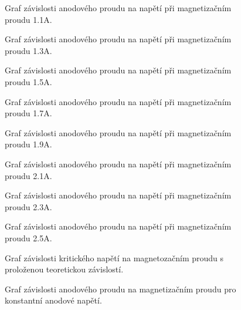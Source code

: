 \documentclass[a4paper,12pt]{article}
\begin{document}
\begin{figure}[h]

\caption{Graf závislosti anodového proudu na napětí při magnetizačním proudu 1.1A.}
\end{figure}

\begin{figure}[h]

\caption{Graf závislosti anodového proudu na napětí při magnetizačním proudu 1.3A.}  
\end{figure}


\begin{figure}[h]

\caption{Graf závislosti anodového proudu na napětí při magnetizačním proudu 1.5A.}
\end{figure}

\begin{figure}[h]

\caption{Graf závislosti anodového proudu na napětí při magnetizačním proudu 1.7A.}
\end{figure}

\begin{figure}[h]

\caption{Graf závislosti anodového proudu na napětí při magnetizačním proudu 1.9A.}
\end{figure}

\begin{figure}[h]

\caption{Graf závislosti anodového proudu na napětí při magnetizačním proudu 2.1A.}
\end{figure}

\begin{figure}[h]

\caption{Graf závislosti anodového proudu na napětí při magnetizačním proudu 2.3A.}
\end{figure}

\begin{figure}[h]

\caption{Graf závislosti anodového proudu na napětí při magnetizačním proudu 2.5A.}
\label{posledni}
\end{figure}

\begin{figure}[h]

\caption{Graf závislosti kritického napětí na magnetozačním proudu s proloženou teoretickou závislostí.}
\label{GUk}
\end{figure}

\begin{figure}[h]

\caption{Graf závislosti anodového proudu na magnetizačním proudu pro konstantní anodové napětí.}
\label{GUB}
\end{figure}
\end{document}
